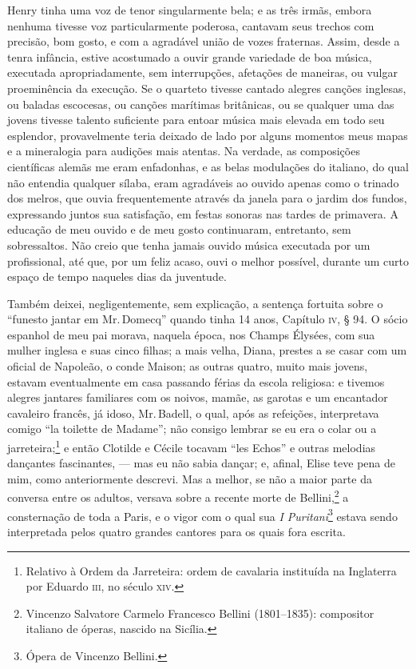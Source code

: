 Henry tinha uma voz de tenor singularmente bela; e as três irmãs, embora
nenhuma tivesse voz particularmente poderosa, cantavam seus trechos com
precisão, bom gosto, e com a agradável união de vozes fraternas. Assim,
desde a tenra infância, estive acostumado a ouvir grande variedade de
boa música, executada apropriadamente, sem interrupções, afetações de
maneiras, ou vulgar proeminência da execução. Se o quarteto tivesse
cantado alegres canções inglesas, ou baladas escocesas, ou canções
marítimas britânicas, ou se qualquer uma das jovens tivesse talento
suficiente para entoar música mais elevada em todo seu esplendor,
provavelmente teria deixado de lado por alguns momentos meus mapas e a
mineralogia para audições mais atentas. Na verdade, as composições
científicas alemãs me eram enfadonhas, e as belas modulações do
italiano, do qual não entendia qualquer sílaba, eram agradáveis ao
ouvido apenas como o trinado dos melros, que ouvia frequentemente
através da janela para o jardim dos fundos, expressando juntos sua
satisfação, em festas sonoras nas tardes de primavera. A educação de meu
ouvido e de meu gosto continuaram, entretanto, sem sobressaltos. Não
creio que tenha jamais ouvido música executada por um profissional, até
que, por um feliz acaso, ouvi o melhor possível, durante um curto espaço
de tempo naqueles dias da juventude.

Também deixei, negligentemente, sem explicação, a sentença fortuita
sobre o ``funesto jantar em Mr.\,Domecq'' quando tinha 14 anos, Capítulo
\textsc{iv}, § 94. O sócio espanhol de meu pai morava, naquela época, nos Champs \label{201}
Élysées, com sua mulher inglesa e suas cinco filhas; a mais velha,
Diana, prestes a se casar com um oficial de Napoleão, o conde Maison; as
outras quatro, muito mais jovens, estavam eventualmente em casa passando
férias da escola religiosa: e tivemos alegres jantares familiares com os
noivos, mamãe, as garotas e um encantador cavaleiro francês, já idoso,
Mr.\,Badell, o qual, após as refeições, interpretava comigo ``la toilette
de Madame''; não consigo lembrar se eu era o colar ou a
jarreteira;\footnote{Relativo à Ordem da Jarreteira: ordem de cavalaria
  instituída na Inglaterra por Eduardo \textsc{iii}, no século \textsc{xiv}.}
e então Clotilde e Cécile tocavam ``les Echos'' e outras melodias
dançantes fascinantes, --- mas eu não sabia dançar; e, afinal, Elise teve
pena de mim, como anteriormente descrevi. Mas a melhor, se não a maior
parte da conversa entre os adultos, versava sobre a recente morte de
Bellini,\footnote{Vincenzo Salvatore Carmelo Francesco Bellini
  (1801--1835): compositor italiano de óperas, nascido na Sicília.} a consternação de toda a Paris, e o vigor com o qual sua
\textit{I Puritani}\footnote{Ópera de Vincenzo Bellini.}
estava sendo interpretada pelos quatro grandes cantores para os quais
fora escrita.

